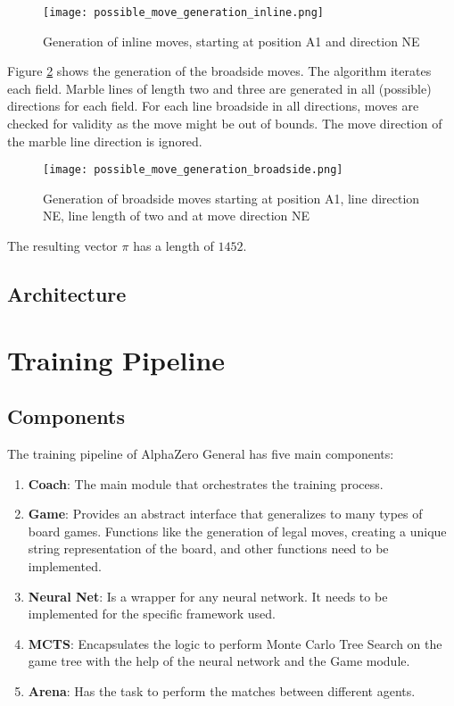 \begin{enumerate}
          \begin{figure}
              \centering
              \texttt{[image: possible\_move\_generation\_inline.png]}
              \caption{Generation of inline moves, starting at position A1 and direction NE}
              \label{possible_move_generation_inline}
          \end{figure}

          Figure \ref{possible_move_generation_broadside} shows the generation of the broadside moves. The algorithm iterates each field. Marble lines of length two and three are generated in all (possible) directions for each field. For each line broadside in all directions, moves are checked for validity as the move might be out of bounds. The move direction of the marble line direction is ignored.

          \begin{figure}
              \centering
              \texttt{[image: possible\_move\_generation\_broadside.png]}
              \caption{Generation of broadside moves starting at position A1, line direction NE, line length of two and at move direction NE}
              \label{possible_move_generation_broadside}
          \end{figure}

          The resulting vector $\pi$ has a length of $1452$.
\end{enumerate}

\subsection{Architecture}
\label{neural_network_architecture}
\section{Training Pipeline}
\subsection{Components}
\label{components}

The training pipeline of AlphaZero General has five main components:
\begin{enumerate}
    \item \textbf{Coach}: The main module that orchestrates the training process.
    \item \textbf{Game}: Provides an abstract interface that generalizes to many types of board games. Functions like the generation of legal moves, creating a unique string representation of the board, and other functions need to be implemented.
    \item \textbf{Neural Net}: Is a wrapper for any neural network. It needs to be implemented for the specific framework used.
    \item \textbf{MCTS}: Encapsulates the logic to perform Monte Carlo Tree Search on the game tree with the help of the neural network and the Game module.
    \item \textbf{Arena}: Has the task to perform the matches between different agents.
\end{enumerate}

